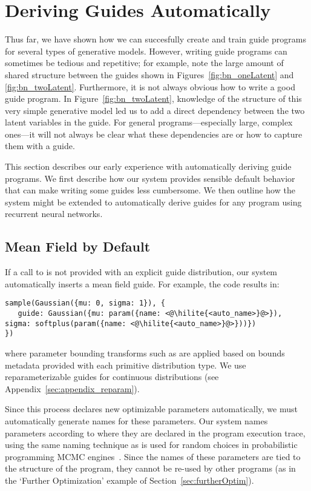 \section{Deriving Guides Automatically}
\label{sec:autoGuide}

Thus far, we have shown how we can succesfully create and train guide programs for several types of generative models. However, writing guide programs can sometimes be tedious and repetitive; for example, note the large amount of shared structure between the guides shown in Figures~\ref{fig:bn_oneLatent} and \ref{fig:bn_twoLatent}. Furthermore, it is not always obvious how to write a good guide program. In Figure~\ref{fig:bn_twoLatent}, knowledge of the structure of this very simple generative model led us to add a direct dependency between the two latent variables in the guide. For general programs---especially large, complex ones---it will not always be clear what these dependencies are or how to capture them with a guide.

This section describes our early experience with automatically deriving guide programs. We first describe how our system provides sensible default behavior that can make writing some guides less cumbersome. We then outline how the system might be extended to automatically derive guides for any program using recurrent neural networks.

\subsection{Mean Field by Default}
\label{sec:autoGuide:meanField}

If a call to  is not provided with an explicit guide distribution, our system automatically inserts a mean field guide. For example, the code  results in:
\begin{lstlisting}
sample(Gaussian({mu: 0, sigma: 1}), {
   guide: Gaussian({mu: param({name: <@\hilite{<auto_name>}@>}), sigma: softplus(param({name: <@\hilite{<auto_name>}@>}))})
})
\end{lstlisting}
where parameter bounding transforms such as  are applied based on bounds metadata provided with each primitive distribution type. We use reparameterizable guides for continuous distributions (see Appendix~\ref{sec:appendix_reparam}).

Since this process declares new optimizable parameters automatically, we must automatically generate names for these parameters. Our system names parameters according to where they are declared in the program execution trace, using the same naming technique as is used for random choices in probabilistic programming MCMC engines~\cite{Lightweight}. Since the names of these parameters are tied to the structure of the program, they cannot be re-used by other programs (as in the `Further Optimization' example of Section~\ref{sec:furtherOptim}).

